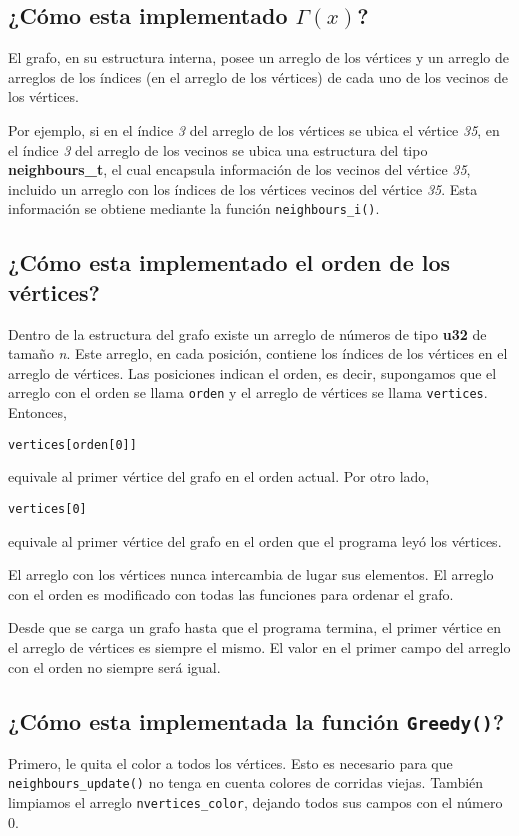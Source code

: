 \documentclass[11pt]{article}   	%
\begin{document}
\subsection{¿Cómo esta implementado $\Gamma(x)$?}
El grafo, en su estructura interna, posee un arreglo de los vértices y un arreglo de arreglos de los
índices (en el arreglo de los vértices) de cada uno de los vecinos de los vértices.

Por ejemplo, si en el índice \emph{3} del arreglo de los vértices se ubica el vértice \emph{35}, en el
índice \emph{3} del arreglo de los vecinos se ubica una estructura del tipo \textbf{neighbours\_t}, el cual
encapsula información de los vecinos del vértice \emph{35}, incluido un arreglo con los índices de los
vértices vecinos del vértice \emph{35}. Esta información se obtiene mediante la función 
\texttt{neighbours\_i()}.

\lstset{style=customC}
\subsection{¿Cómo esta implementado el orden de los vértices?}
Dentro de la estructura del grafo existe un arreglo de números de tipo \textbf{u32} de tamaño \emph{n}.
Este arreglo, en cada posición, contiene los índices de los vértices en el arreglo de vértices.
Las posiciones indican el orden, es decir, supongamos que el arreglo con el orden se llama \texttt{orden}
y el arreglo de vértices se llama \texttt{vertices}. Entonces,
\begin{lstlisting}
vertices[orden[0]]
\end{lstlisting}
equivale al primer vértice del grafo en el orden actual. Por otro lado,
\begin{lstlisting}
vertices[0]
\end{lstlisting}
equivale al primer vértice del grafo en el orden que el programa leyó los vértices.

El arreglo con los vértices nunca intercambia de lugar sus elementos. El arreglo con el orden es modificado
con todas las funciones para ordenar el grafo.

Desde que se carga un grafo hasta que el programa termina, el primer vértice en el arreglo de vértices es
siempre el mismo. El valor en el primer campo del arreglo con el orden no siempre será igual.

\subsection{¿Cómo esta implementada la función \texttt{Greedy()}?}
Primero, le quita el color a todos los vértices. Esto es necesario para que \texttt{neighbours\_update()}
no tenga en cuenta colores de corridas viejas. También limpiamos el arreglo \texttt{nvertices\_color},
dejando todos sus campos con el número 0.
\end{document}
